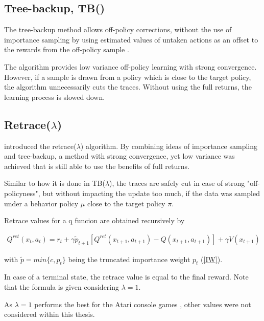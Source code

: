 \subsection{Tree-backup, TB(\lambda)}

The tree-backup method allows off-policy corrections, without the use of importance sampling by using estimated values of untaken actions as an offset to the rewards from the off-policy sample \citet{Precup00}.

The algorithm provides low variance off-policy learning with strong convergence.
However, if a sample is drawn from a policy which is close to the target policy, the algorithm unnecessarily cuts the traces. Without using the full returns, the learning process is slowed down.
\pagebreak
\subsection{Retrace($\lambda$)}

\citet{Munos16} introduced the retrace($\lambda$) algorithm. By combining ideas of importance sampling and tree-backup, a method with strong convergence, yet low variance was achieved that is still able to use the benefits of full returns.

Similar to how it is done in TB($\lambda$), the traces are safely cut in case of strong "off-policyness", but without impacting the update too much, if the data was sampled under a behavior policy $\mu$ close to the target policy $\pi$.

Retrace values for a q funcion are obtained recursively by

\begin{align}
{
Q^{ret}(x_t,a_t)=r_t+\gamma \tilde{p}_{t+1} [Q^{ret}(x_{t+1},a_{t+1} ) -  Q(x_{t+1},a_{t+1})] + \gamma V(x_{t+1})
}
\label{qretrace}
\end{align}

with $\tilde{p} = min\{c,p_t\}$ being the truncated importance weight $p_t$ (\ref{IW}).

In case of a terminal state, the retrace value is equal to the final reward.
Note that the formula is given considering $\lambda = 1$.

As $\lambda = 1$ performs the best for the Atari console games \citep{Munos16}, other values were not considered within this thesis.

\pagebreak
